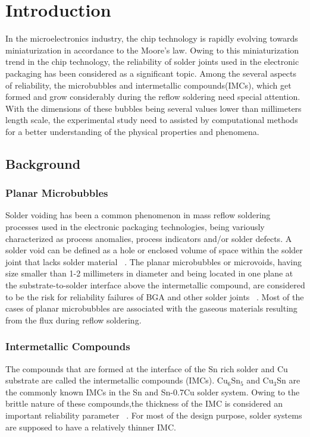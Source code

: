 \chapter{Introduction}\label{Chap1}
In the microelectronics industry, the chip technology is rapidly evolving towards miniaturization in accordance to the Moore's law. Owing to this miniaturization trend in the chip technology, the reliability of solder joints used in the electronic packaging has been considered as a significant topic.  Among the several aspects of reliability, the microbubbles and intermetallic compounds(IMCs), which get formed and grow considerably during the reflow soldering need special attention. With the dimensions of these bubbles being several values lower than millimeters length scale, the experimental study need to assisted by computational methods for a better understanding of the physical properties and phenomena.

\section{Background}\label{Chap1_01}

\subsection{Planar Microbubbles} \label{Chap1_01_01}
Solder voiding has been a common phenomenon in mass reflow soldering processes used in the electronic packaging technologies, being variously characterized as process anomalies, process indicators and/or solder defects. A solder void can be defined as a hole or enclosed volume of space within the solder joint that lacks solder material ~\cite{TLLewis:2012}. The planar microbubbles or microvoids, having size smaller than 1-2 millimeters in diameter and being located in one plane at the substrate-to-solder interface above the intermetallic compound, are considered to be the risk for reliability failures of BGA and other solder joints ~\cite{RAspandiar:2006}. Most of the cases of planar microbubbles are associated with the gaseous materials resulting from the flux during reflow soldering.

\subsection{Intermetallic Compounds} \label{Chap1_01_02}
The compounds that are formed at the interface of the Sn rich solder and Cu substrate  are called the intermetallic compounds (IMCs). Cu$_6$Sn$_5$ and Cu$_3$Sn are the commonly known IMCs in the Sn and Sn-0.7Cu solder system.  Owing to the brittle nature of these compounds,the thickness of the IMC is considered an important reliability parameter ~\cite{MLHuang2015}. For most of the design purpose, solder systems are supposed to have a relatively thinner IMC.



